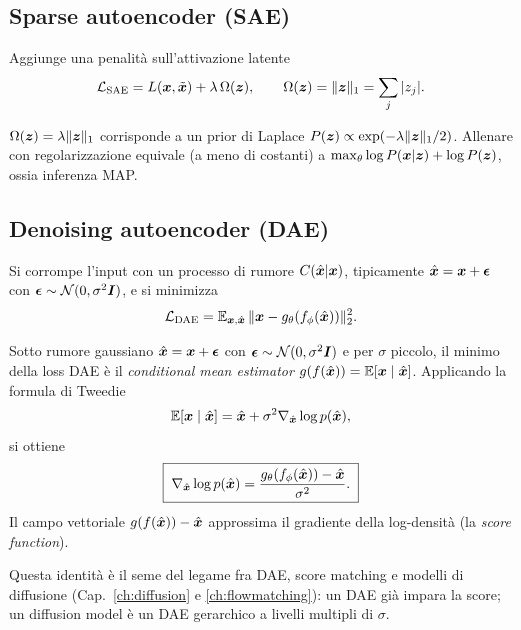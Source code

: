 \subsection{Sparse autoencoder (SAE)}
Aggiunge una penalità sull'attivazione latente
\[
\mathcal{L}_{\text{SAE}} = L(\bm{x}, \tilde{\bm{x}}) + \lambda \, \Omega(\bm{z}), \qquad \Omega(\bm{z}) = \|\bm{z}\|_1 = \sum_j |z_j|.
\]
\begin{remark}
$\Omega(\bm{z}) = \lambda \|\bm{z}\|_1$ corrisponde a un prior di Laplace $P(\bm{z}) \propto \exp(-\lambda \|\bm{z}\|_1/2)$. Allenare con regolarizzazione equivale (a meno di costanti) a $\max_\theta \log P(\bm{x}|\bm{z}) + \log P(\bm{z})$, ossia inferenza MAP.
\end{remark}

\subsection{Denoising autoencoder (DAE)}
Si corrompe l'input con un processo di rumore $C(\hat{\bm{x}} | \bm{x})$, tipicamente $\hat{\bm{x}} = \bm{x} + \boldsymbol{\epsilon}$ con $\boldsymbol{\epsilon} \sim \mathcal{N}(0, \sigma^2 \bm{I})$, e si minimizza
\[
\mathcal{L}_{\text{DAE}} = \mathbb{E}_{\bm{x},\hat{\bm{x}}}\, \| \bm{x} - g_\theta(f_\phi(\hat{\bm{x}})) \|_2^2 .
\]

\begin{theorem}
Sotto rumore gaussiano $\hat{\bm{x}} = \bm{x} + \boldsymbol{\epsilon}$ con $\boldsymbol{\epsilon} \sim \mathcal{N}(0, \sigma^2 \bm{I})$ e per $\sigma$ piccolo, il minimo della loss DAE è il \emph{conditional mean estimator} $g(f(\hat{\bm{x}})) = \mathbb{E}[\bm{x} \mid \hat{\bm{x}}]$. Applicando la formula di Tweedie
\[
\mathbb{E}[\bm{x} \mid \hat{\bm{x}}] = \hat{\bm{x}} + \sigma^2 \nabla_{\hat{\bm{x}}} \log p(\hat{\bm{x}}),
\]
si ottiene
\[
\boxed{\;\nabla_{\hat{\bm{x}}} \log p(\hat{\bm{x}}) = \frac{g_\theta(f_\phi(\hat{\bm{x}})) - \hat{\bm{x}}}{\sigma^2}.\;}
\]
Il campo vettoriale $g(f(\hat{\bm{x}})) - \hat{\bm{x}}$ approssima il gradiente della log-densità (la \emph{score function}).
\end{theorem}

\begin{remark}
Questa identità è il seme del legame fra DAE, score matching e modelli di diffusione (Cap.~\ref{ch:diffusion} e \ref{ch:flowmatching}): un DAE già impara la score; un diffusion model è un DAE gerarchico a livelli multipli di $\sigma$.
\end{remark}

